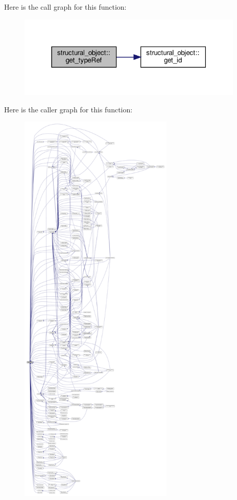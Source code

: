 Here is the call graph for this function\+:
\nopagebreak
\begin{figure}[H]
\begin{center}
\leavevmode
\includegraphics[width=306pt]{d8/da3/classstructural__object_ad2a7fb5dd4d4010876959da82af4f459_cgraph}
\end{center}
\end{figure}
Here is the caller graph for this function\+:
\nopagebreak
\begin{figure}[H]
\begin{center}
\leavevmode
\includegraphics[height=550pt]{d8/da3/classstructural__object_ad2a7fb5dd4d4010876959da82af4f459_icgraph}
\end{center}
\end{figure}
\mbox{\label{classstructural__object_a7e02b1926026f213fa75e099bef0f6e0}} 
